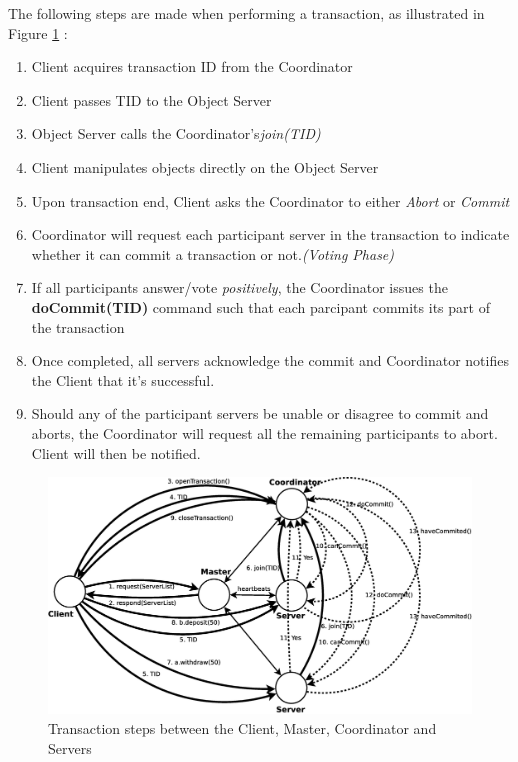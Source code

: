 \documentclass[times, 10pt,twocolumn]{article}
\begin{document}
The following steps are made when performing a transaction, as illustrated in Figure \ref{fig:transa} : 

\begin{enumerate}
\item Client acquires transaction ID from the Coordinator 
\item Client passes TID to the Object Server
\item Object Server calls the Coordinator's{\it join(TID)}
\item Client manipulates objects directly on the Object Server
\item Upon transaction end, Client asks the Coordinator to either {\it Abort} or {\it Commit} 
\item Coordinator will request each participant server in the transaction to indicate whether it can commit a transaction or not.{\it (Voting Phase)}
\item If all participants answer/vote {\it positively}, the Coordinator issues the {\bf doCommit(TID)} command such that each parcipant commits its part of the transaction
\item Once completed, all servers acknowledge the commit and Coordinator notifies the Client that it's successful.
\item Should any of the participant servers be unable or disagree to commit and aborts, the Coordinator will request all the remaining participants to abort. Client will then be notified.
\end{enumerate}

\begin{figure}
\centering
\includegraphics[scale=0.2]{transaction.eps}
\caption{Transaction steps between the Client, Master, Coordinator and Servers}
\label{fig:transa}
\end{figure}
\end{document}
